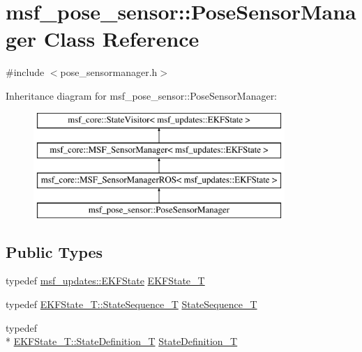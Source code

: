 \hypertarget{classmsf__pose__sensor_1_1PoseSensorManager}{\section{msf\-\_\-pose\-\_\-sensor\-:\-:Pose\-Sensor\-Manager Class Reference}
\label{classmsf__pose__sensor_1_1PoseSensorManager}
}


{\ttfamily \#include $<$pose\-\_\-sensormanager.\-h$>$}

Inheritance diagram for msf\-\_\-pose\-\_\-sensor\-:\-:Pose\-Sensor\-Manager\-:\begin{figure}[H]
\begin{center}
\leavevmode
\includegraphics[height=4.000000cm]{classmsf__pose__sensor_1_1PoseSensorManager}
\end{center}
\end{figure}
\subsection*{Public Types}
\begin{DoxyCompactItemize}
\item 
typedef \hyperlink{namespacemsf__updates_a03b0801c76b7400623b00ad4d28f9bcc}{msf\-\_\-updates\-::\-E\-K\-F\-State} \hyperlink{classmsf__pose__sensor_1_1PoseSensorManager_a1b470ca74ac6b8d26ccfe503d3387422}{E\-K\-F\-State\-\_\-\-T}
\item 
typedef \hyperlink{structmsf__core_1_1GenericState__T_a75fe70f7c7517dbf7d4c91b75b08a1dd}{E\-K\-F\-State\-\_\-\-T\-::\-State\-Sequence\-\_\-\-T} \hyperlink{classmsf__pose__sensor_1_1PoseSensorManager_af5797eaa58d68825c1b18b9311e6b1eb}{State\-Sequence\-\_\-\-T}
\item 
typedef \\*
\hyperlink{structmsf__core_1_1GenericState__T_a9a7d65b0325658ab07b81960a3ed4604}{E\-K\-F\-State\-\_\-\-T\-::\-State\-Definition\-\_\-\-T} \hyperlink{classmsf__pose__sensor_1_1PoseSensorManager_a192e211ad0579d4517378acc155652f7}{State\-Definition\-\_\-\-T}
\end{DoxyCompactItemize}
